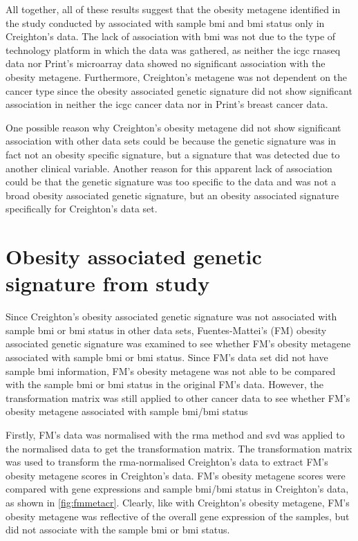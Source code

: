 All together, all of these results suggest that the obesity metagene identified in the study conducted by \citet{Creighton2012} associated with sample \gls{bmi} and \gls{bmi} status only in Creighton's data.
The lack of association with \gls{bmi} was not due to the type of technology platform in which the data was gathered, as neither the \gls{icgc} \gls{rnaseq} data nor Print's microarray data showed no significant association with the obesity metagene.
Furthermore, Creighton's metagene was not dependent on the cancer type since the obesity associated genetic signature did not show significant association in neither the \gls{icgc} cancer data nor in Print's breast cancer data.

One possible reason why Creighton's obesity metagene did not show significant association with other data sets could be because the genetic signature was in fact not an obesity specific signature, but a signature that was detected due to another clinical variable.
Another reason for this apparent lack of association could be that the genetic signature was too specific to the data and was not a broad obesity associated genetic signature, but an obesity associated signature specifically for Creighton's data set.

\section{Obesity associated genetic signature from \citet{Fuentes-Mattei2014} study}
\label{sec:fm_obesity_metagene}

Since Creighton's obesity associated genetic signature was not associated with sample \gls{bmi} or \gls{bmi} status in other data sets, Fuentes-Mattei's (FM) obesity associated genetic signature was examined to see whether FM's obesity metagene associated with sample \gls{bmi} or \gls{bmi} status.
Since FM's data set did not have sample \gls{bmi} information, FM's obesity metagene was not able to be compared with the sample \gls{bmi} or \gls{bmi} status in the original FM's data.
However, the transformation matrix was still applied to other cancer data to see whether FM's obesity metagene associated with sample \gls{bmi}/\gls{bmi} status

Firstly, FM's data was normalised with the \gls{rma} method and \gls{svd} was applied to the normalised data to get the transformation matrix.
The transformation matrix was used to transform the \gls{rma}-normalised Creighton's data to extract FM's obesity metagene scores in Creighton's data.
FM's obesity metagene scores were compared with gene expressions and sample \gls{bmi}/\gls{bmi} status in Creighton's data, as shown in \cref{fig:fmmetacr}.
Clearly, like with Creighton's obesity metagene, FM's obesity metagene was reflective of the overall gene expression of the samples, but did not associate with the sample \gls{bmi} or \gls{bmi} status.

